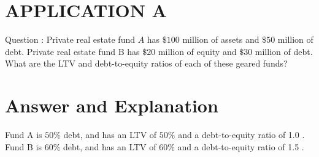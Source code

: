 \documentclass[11pt]{article}
\begin{document}
\section*{APPLICATION A}
Question : Private real estate fund $A$ has $\$ 100$ million of assets and $\$ 50$ million of debt. Private real estate fund B has $\$ 20$ million of equity and $\$ 30$ million of debt. What are the LTV and debt-to-equity ratios of each of these geared funds?

\section*{Answer and Explanation}
Fund A is $50 \%$ debt, and has an LTV of $50 \%$ and a debt-to-equity ratio of 1.0 . Fund B is $60 \%$ debt, and has an LTV of $60 \%$ and a debt-to-equity ratio of 1.5 .
\end{document}
